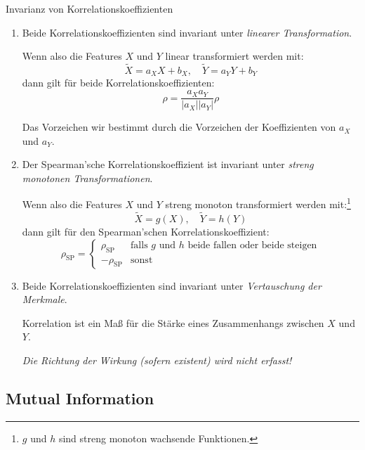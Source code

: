 \begin{defi}{Invarianz von Korrelationskoeffizienten}
    \begin{enumerate}
        \item Beide Korrelationskoeffizienten sind invariant unter \emph{linearer Transformation}.

              Wenn also die Features $X$ und $Y$ linear transformiert werden mit:
              \[
                  \tilde{X} = a_X X + b_X, \quad \tilde{Y} = a_Y Y + b_Y
              \]
              dann gilt für beide Korrelationskoeffizienten:
              \[
                  \rho = \frac{a_X a_Y}{|a_X| |a_Y|} \rho
              \]

              Das Vorzeichen wir bestimmt durch die Vorzeichen der Koeffizienten von $a_X$ und $a_Y$.
        \item Der Spearman'sche Korrelationskoeffizient ist invariant unter \emph{streng monotonen Transformationen}.

              Wenn also die Features $X$ und $Y$ streng monoton transformiert werden mit:\footnote{$g$ und $h$ sind streng monoton wachsende Funktionen.}
              \[
                  \tilde{X} = g(X), \quad \tilde{Y} = h(Y)
              \]
              dann gilt für den Spearman'schen Korrelationskoeffizient:
              \[
                  \rho_{\text{SP}} = \begin{cases}
                      \rho_{\text{SP}}  & \text{falls $g$ und $h$ beide fallen oder beide steigen} \\
                      -\rho_{\text{SP}} & \text{sonst}
                  \end{cases}
              \]
        \item Beide Korrelationskoeffizienten sind invariant unter \emph{Vertauschung der Merkmale}.

              Korrelation ist ein Maß für die Stärke eines Zusammenhangs zwischen $X$ und $Y$.

              \emph{Die Richtung der Wirkung (sofern existent) wird nicht erfasst!}
    \end{enumerate}
\end{defi}

\subsection{Mutual Information}

